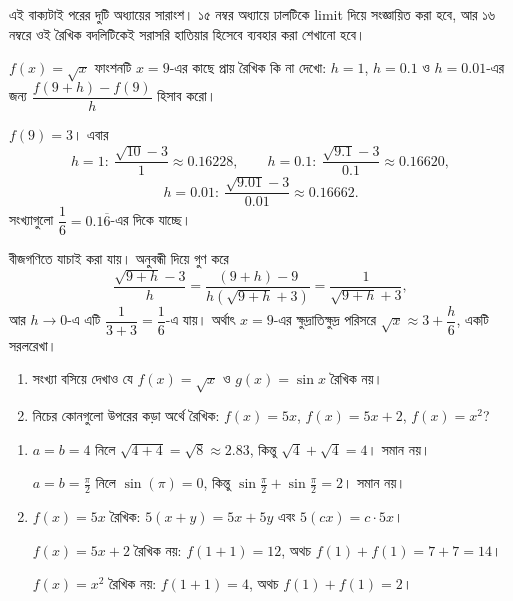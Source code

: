 \documentclass[11pt]{article}
\begin{document}
এই বাক্যটাই পরের দুটি অধ্যায়ের সারাংশ। ১৫ নম্বর অধ্যায়ে ঢালটিকে limit দিয়ে
সংজ্ঞায়িত করা হবে, আর ১৬ নম্বরে ওই রৈখিক বদলিটিকেই সরাসরি হাতিয়ার হিসেবে
ব্যবহার করা শেখানো হবে।

\begin{example}
$f(x) = \sqrt{x}$ ফাংশনটি $x = 9$-এর কাছে প্রায় রৈখিক কি না দেখো:
$h = 1$, $h = 0.1$ ও $h = 0.01$-এর জন্য
$\dfrac{f(9+h)-f(9)}{h}$ হিসাব করো।
\end{example}

\begin{solbox}
$f(9) = 3$। এবার
\[
  h = 1: \ \frac{\sqrt{10}-3}{1} \approx 0.16228, \qquad
  h = 0.1: \ \frac{\sqrt{9.1}-3}{0.1} \approx 0.16620 ,
\]
\[
  h = 0.01: \ \frac{\sqrt{9.01}-3}{0.01} \approx 0.16662 .
\]
সংখ্যাগুলো $\dfrac{1}{6} = 0.1\overline{6}$-এর দিকে যাচ্ছে।

বীজগণিতে যাচাই করা যায়। অনুবন্ধী দিয়ে গুণ করে
\[
  \frac{\sqrt{9+h}-3}{h}
  = \frac{(9+h)-9}{h\left( \sqrt{9+h}+3 \right)}
  = \frac{1}{\sqrt{9+h}+3} ,
\]
আর $h \to 0$-এ এটি $\dfrac{1}{3+3} = \dfrac{1}{6}$-এ  যায়। অর্থাৎ $x = 9$-এর
ক্ষুদ্রাতিক্ষুদ্র পরিসরে $\sqrt{x} \approx 3 + \dfrac{h}{6}$, একটি সরলরেখা।
\end{solbox}

 \begin{enumerate}
  \item সংখ্যা বসিয়ে দেখাও যে $f(x) = \sqrt{x}$ ও $g(x) = \sin x$ রৈখিক নয়।
  \item নিচের কোনগুলো উপরের কড়া অর্থে রৈখিক: $f(x) = 5x$, $f(x) = 5x+2$,
        $f(x) = x^{2}$?
\end{enumerate}

\begin{sol}
\begin{enumerate}
  \item $a = b = 4$ নিলে $\sqrt{4+4} = \sqrt{8} \approx 2.83$, কিন্তু
        $\sqrt{4}+\sqrt{4} = 4$। সমান নয়।

        $a = b = \tfrac{\pi}{2}$ নিলে $\sin(\pi) = 0$, কিন্তু
        $\sin\tfrac{\pi}{2} + \sin\tfrac{\pi}{2} = 2$। সমান নয়।
  \item $f(x) = 5x$ রৈখিক: $5(x+y) = 5x+5y$ এবং $5(cx) = c \cdot 5x$।

        $f(x) = 5x+2$ রৈখিক নয়: $f(1+1) = 12$, অথচ $f(1)+f(1) = 7+7 = 14$।

        $f(x) = x^{2}$ রৈখিক নয়: $f(1+1) = 4$, অথচ $f(1)+f(1) = 2$।
\end{enumerate}
\end{sol}
\end{document}
